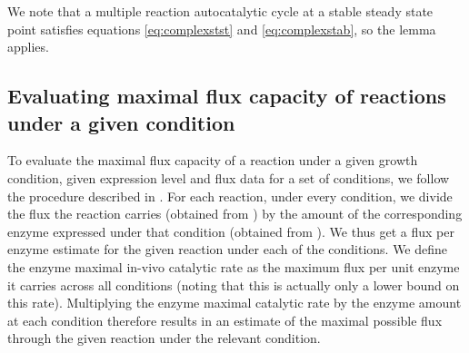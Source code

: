     We note that a multiple reaction autocatalytic cycle at a stable steady state point satisfies equations \ref{eq:complexstst} and \ref{eq:complexstab}, so the lemma applies.

    \subsection{Evaluating maximal flux capacity of reactions under a given condition}
    To evaluate the maximal flux capacity of a reaction under a given growth condition, given expression level and flux data for a set of conditions, we follow the procedure described in \cite{Davidi2016-ga}.
    For each reaction, under every condition, we divide the flux the reaction carries (obtained from \cite{Gerosa2015-oq}) by the amount of the corresponding enzyme expressed under that condition (obtained from \cite{Schmidt2015}).
    We thus get a flux per enzyme estimate for the given reaction under each of the conditions.
    We define the enzyme maximal in-vivo catalytic rate as the maximum flux per unit enzyme it carries across all conditions (noting that this is actually only a lower bound on this rate).
    Multiplying the enzyme maximal catalytic rate by the enzyme amount at each condition therefore results in an estimate of the maximal possible flux through the given reaction under the relevant condition.
